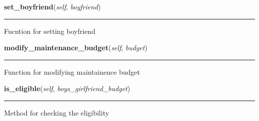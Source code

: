     \vspace{0.5ex}

\hspace{.8\funcindent}\begin{boxedminipage}{\funcwidth}

    \raggedright \textbf{set\_boyfriend}(\textit{self}, \textit{boyfriend})

    \vspace{-1.5ex}

    \rule{\textwidth}{0.5\fboxrule}
\setlength{\parskip}{2ex}
    Fucntion for setting boyfriend

\setlength{\parskip}{1ex}
    \end{boxedminipage}

    \label{girl:girl:modify_maintenance_budget}

    \vspace{0.5ex}

\hspace{.8\funcindent}\begin{boxedminipage}{\funcwidth}

    \raggedright \textbf{modify\_maintenance\_budget}(\textit{self}, \textit{budget})

    \vspace{-1.5ex}

    \rule{\textwidth}{0.5\fboxrule}
\setlength{\parskip}{2ex}
    Function for modifying maintainence budget

\setlength{\parskip}{1ex}
    \end{boxedminipage}

    \label{girl:girl:is_eligible}

    \vspace{0.5ex}

\hspace{.8\funcindent}\begin{boxedminipage}{\funcwidth}

    \raggedright \textbf{is\_eligible}(\textit{self}, \textit{boys\_girlfriend\_budget})

    \vspace{-1.5ex}

    \rule{\textwidth}{0.5\fboxrule}
\setlength{\parskip}{2ex}
    Method for checking the eligibility

\setlength{\parskip}{1ex}
    \end{boxedminipage}


